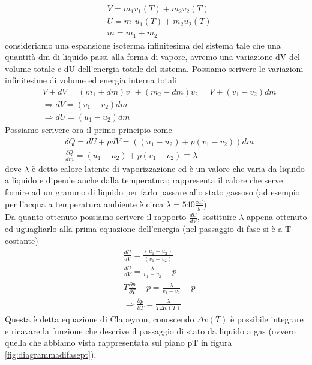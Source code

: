 \documentclass[
10pt, %
a4paper, %
oneside, %
headinclude,footinclude, %
BCOR5mm, %
]{scrartcl}
\begin{document}
\begin{align*}
	&V = m_1 v_1(T)+m_2 v_2 (T) \\
	&U =m_1 u_1(T)+m_2 u_2(T)\\
	&m = m_1 + m_2
\end{align*}
consideriamo una espansione isoterma infinitesima del sistema tale che una quantità dm di liquido passi alla forma di vapore, avremo una variazione dV del volume totale e dU dell'energia totale del sistema. Possiamo scrivere le variazioni infinitesime di volume ed energia interna totali
\begin{align*}
	&V + dV = (m_1 + dm) v_1 + (m_2 - dm) v_2 = V + (v_1 - v_2)dm\\
	&\Rightarrow dV = (v_1 - v_2)dm\\
	&\Rightarrow dU = (u_1 - u_2)dm
\end{align*}   
Possiamo scrivere ora il primo principio come
\begin{align*}
	&\delta Q = dU + pdV = ((u_1 - u_2) + p(v_1 - v_2))dm\\
	&\frac{\delta Q}{dm} = (u_1 - u_2) + p(v_1 - v_2)\equiv \lambda
\end{align*}
dove $\lambda$ è detto calore latente di vaporizzazione ed è un valore che varia da liquido a liquido e dipende anche dalla temperatura; rappresenta il calore che serve fornire ad un grammo di liquido per farlo passare allo stato gassoso (ad esempio per l'acqua a temperatura ambiente è circa \(\lambda = 540 \frac{cal}{g}\)).\\
Da quanto ottenuto possiamo scrivere il rapporto $\frac{dU}{dV}$, sostituire $\lambda$ appena ottenuto ed uguagliarlo alla prima equazione dell'energia (nel passaggio di fase si è a T costante)
\begin{align*}
	&\frac{dU}{dV} =\frac{(u_1 - u_2)}{(v_1 - v_2)} \\
	&\frac{dU}{dV} =\frac{\lambda}{v_1-v_2}-p\\
	& T\frac{\partial p}{\partial T}-p= \frac{\lambda}{v_1-v_2}-p\\
	&\Rightarrow \frac{\partial p}{\partial T} = \frac{\lambda}{T\Delta v(T)}
\end{align*}
Questa è detta equazione di Clapeyron, conoscendo \(\Delta v(T)\) è possibile integrare e ricavare la funzione che descrive il passaggio di stato da liquido a gas (ovvero quella che abbiamo vista rappresentata sul piano pT in figura \ref{fig:diagrammadifasept}).
\end{document}
